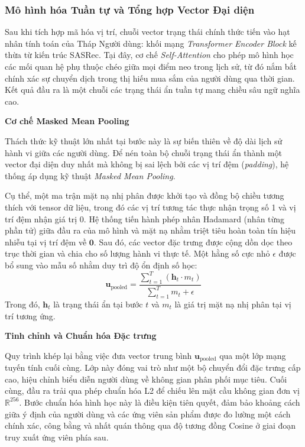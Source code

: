 \subsubsection{Mô hình hóa Tuần tự và Tổng hợp Vector Đại diện}

Sau khi tích hợp mã hóa vị trí, chuỗi vector trạng thái chính thức tiến vào hạt nhân tính toán của Tháp Người dùng: khối mạng \textit{Transformer Encoder Block} kế thừa từ kiến trúc SASRec. Tại đây, cơ chế \textit{Self-Attention} cho phép mô hình học các mối quan hệ phụ thuộc chéo giữa mọi điểm neo trong lịch sử, từ đó nắm bắt chính xác sự chuyển dịch trong thị hiếu mua sắm của người dùng qua thời gian. Kết quả đầu ra là một chuỗi các trạng thái ẩn tuần tự mang chiều sâu ngữ nghĩa cao.

\vspace{0.3cm}
\noindent \textbf{Cơ chế Masked Mean Pooling}

Thách thức kỹ thuật lớn nhất tại bước này là sự biến thiên về độ dài lịch sử hành vi giữa các người dùng. Để nén toàn bộ chuỗi trạng thái ẩn thành một vector đại diện duy nhất mà không bị sai lệch bởi các vị trí đệm (\textit{padding}), hệ thống áp dụng kỹ thuật \textit{Masked Mean Pooling}.

Cụ thể, một ma trận mặt nạ nhị phân được khởi tạo và đồng bộ chiều tương thích với tensor dữ liệu, trong đó các vị trí tương tác thực nhận trọng số 1 và vị trí đệm nhận giá trị 0. Hệ thống tiến hành phép nhân Hadamard (nhân từng phần tử) giữa đầu ra của mô hình và mặt nạ nhằm triệt tiêu hoàn toàn tín hiệu nhiễu tại vị trí đệm về $\mathbf{0}$. Sau đó, các vector đặc trưng được cộng dồn dọc theo trục thời gian và chia cho số lượng hành vi thực tế. Một hằng số cực nhỏ $\epsilon$ được bổ sung vào mẫu số nhằm duy trì độ ổn định số học:
$$\mathbf{u}_{\text{pooled}} = \frac{\sum_{t=1}^{T} (\mathbf{h}_t \cdot m_t)}{\sum_{t=1}^{T} m_t + \epsilon}$$
Trong đó, $\mathbf{h}_t$ là trạng thái ẩn tại bước $t$ và $m_t$ là giá trị mặt nạ nhị phân tại vị trí tương ứng.

\vspace{0.3cm}
\noindent \textbf{Tinh chỉnh và Chuẩn hóa Đặc trưng}

Quy trình khép lại bằng việc đưa vector trung bình $\mathbf{u}_{\text{pooled}}$ qua một lớp mạng tuyến tính cuối cùng. Lớp này đóng vai trò như một bộ chuyển đổi đặc trưng cấp cao, hiệu chỉnh biểu diễn người dùng về không gian phân phối mục tiêu. Cuối cùng, đầu ra trải qua phép chuẩn hóa L2 để chiếu lên mặt cầu không gian đơn vị $\mathbb{R}^{256}$. Bước chuẩn hóa hình học này là điều kiện tiên quyết, đảm bảo khoảng cách giữa ý định của người dùng và các ứng viên sản phẩm được đo lường một cách chính xác, công bằng và nhất quán thông qua độ tương đồng Cosine ở giai đoạn truy xuất ứng viên phía sau.


